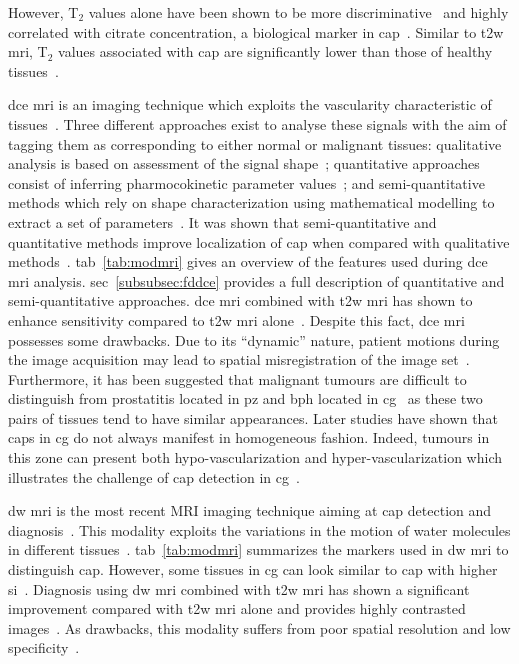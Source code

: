 However, T$_2$ values alone have been shown to be more discriminative~\cite{Liu2011} and highly correlated with citrate concentration, a biological marker in \ac{cap}~\cite{Liney1996,Liney1997}. Similar to \ac{t2w} \ac{mri}, T$_2$ values associated with \ac{cap} are significantly lower than those of healthy tissues~\cite{Liney1996,Gibbs2001}.

\ac{dce} \ac{mri} is an imaging technique which exploits the vascularity characteristic of tissues~\cite{Verma2012}. %
Three different approaches exist to analyse these signals with the aim of tagging them as corresponding to either normal or malignant tissues: qualitative analysis is based on assessment of the signal shape~\cite{Hoeks2011}; quantitative approaches consist of inferring pharmocokinetic parameter values~\cite{Tofts2010}; and semi-quantitative methods which rely on shape characterization using mathematical modelling to extract a set of parameters~\cite{Hoeks2011,Verma2012}. It was shown that semi-quantitative and quantitative methods improve localization of \ac{cap} when compared with qualitative methods~\cite{Rosenkrantz2013}. \Acl{tab}~\ref{tab:modmri} gives an overview of the features used during \ac{dce} \ac{mri} analysis. \Acl{sec}~\ref{subsubsec:fddce} provides a full description of quantitative and semi-quantitative approaches. \ac{dce} \ac{mri} combined with \ac{t2w} \ac{mri} has shown to enhance sensitivity compared to \ac{t2w} \ac{mri} alone~\cite{Jager1997,Kim2005,Schlemmer2004,Zelhof2009}. Despite this fact, \ac{dce} \ac{mri} possesses some drawbacks. Due to its ``dynamic'' nature, patient motions during the image acquisition may lead to spatial misregistration of the image set~\cite{Verma2012}. Furthermore, it has been suggested that malignant tumours are difficult to distinguish from prostatitis located in \ac{pz} and \ac{bph} located in \ac{cg}~\cite{Hoeks2011,Verma2012} as these two pairs of tissues tend to have similar appearances. Later studies have shown that \acp{cap} in \ac{cg} do not always manifest in homogeneous fashion. Indeed, tumours in this zone can present both hypo-vascularization and hyper-vascularization which illustrates the challenge of \ac{cap} detection in \ac{cg}~\cite{Niekerk2013}.

\ac{dw} \ac{mri} is the most recent MRI imaging technique aiming at \ac{cap} detection and diagnosis~\cite{Scheidler1999}. This modality exploits the variations in the motion of water molecules in different tissues~\cite{LeBihan1988,Koh2007}. \Acl{tab}~\ref{tab:modmri} summarizes the markers used in \ac{dw} \ac{mri} to distinguish \ac{cap}. However, some tissues in \ac{cg} can look similar to \ac{cap} with higher \ac{si}~\cite{Barentsz2012}. Diagnosis using \ac{dw} \ac{mri} combined with \ac{t2w} \ac{mri} has shown a significant improvement compared with \ac{t2w} \ac{mri} alone and provides highly contrasted images~\cite{Shimofusa2005,Padhani2011,Choi2007}. As drawbacks, this modality suffers from poor spatial resolution and low specificity~\cite{Choi2007}.

